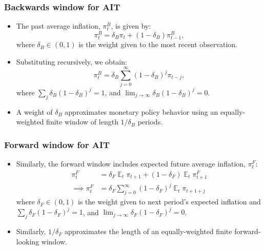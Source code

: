 \documentclass{beamer}
\DeclareMathOperator{\E}{\mathbb{E}}
\begin{document}
\begin{frame}
	\frametitle{Backwards window for AIT}
	\begin{itemize}
		\setlength{\itemsep}{1em}
		\item The past average inflation, $\pi_t^B$, is given by:
		\begin{equation}\label{eq:backward}
			\pi_t^B = \delta_B \pi_t + (1-\delta_B) \pi_{t-1}^B,
		\end{equation}
		where $\delta_B \in (0,1)$ is the weight given to the most recent observation.
		\item Substituting recursively, we obtain:
		\begin{equation*}\label{eq:backward_all}
			\pi_t^B = \delta_B \sum_{j=0}^{\infty} (1-\delta_B)^j \pi_{t-j},
		\end{equation*}
		where $\sum_j \delta_B (1-\delta_B)^j=1$, and $\lim_{j \to \infty} \delta_B (1-\delta_B)^j=0$.
		\item A weight of $\delta_B$ approximates monetary policy behavior using an equally-weighted finite window of length $1 / \delta_B$ periods.
	\end{itemize}
\end{frame}

\begin{frame}
	\frametitle{Forward window for AIT}
	\begin{itemize}
		\setlength{\itemsep}{1em}
		\item Similarly, the forward window includes expected future average inflation, $\pi_t^F$:
		\begin{align}\label{eq:forward}
			\pi_t^F &= \delta_F \E_t \pi_{t+1} + (1-\delta_F) \E_t \pi_{t+1}^F \\
			\implies \pi_t^F &= \delta_F \sum_{j=0}^{\infty} (1-\delta_F)^j \E_t \pi_{t+1+j} \nonumber
		\end{align}
		where $\delta_F \in (0,1)$ is the weight given to next period's expected inflation and $\sum_j \delta_F (1-\delta_F)^{j}=1$, and $\lim_{j \to \infty} \delta_F (1-\delta_F)^j=0$.
		\item Similarly, $1/ \delta_F$ approximates the length of an equally-weighted finite forward-looking window.
	\end{itemize}
\end{frame}
\end{document}
